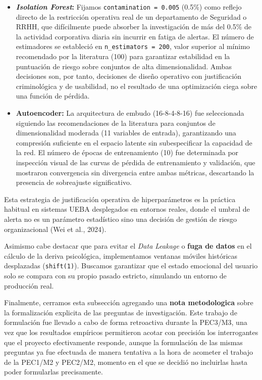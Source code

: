 \documentclass[IB]{TFUOC}%
\begin{document}
\begin{itemize}
    \item \textbf{\textit{Isolation Forest}:} Fijamos \texttt{contamination = 0.005} (0.5\%) como reflejo directo de la restricción operativa real de un departamento de Seguridad o RRHH, que difícilmente puede absorber la investigación de más del 0.5\% de la actividad corporativa diaria sin incurrir en fatiga de alertas. El número de estimadores se estableció en \texttt{n\_estimators = 200}, valor superior al mínimo recomendado por la literatura (100) para garantizar estabilidad en la puntuación de riesgo sobre conjuntos de alta dimensionalidad. Ambas decisiones son, por tanto, decisiones de diseño operativo con justificación criminológica y de usabilidad, no el resultado de una optimización ciega sobre una función de pérdida.
    
    \item \textbf{Autoencoder:} La arquitectura de embudo (16-8-4-8-16) fue seleccionada siguiendo las recomendaciones de la literatura para conjuntos de dimensionalidad moderada (11 variables de entrada), garantizando una compresión suficiente en el espacio latente sin subespecificar la capacidad de la red. El número de épocas de entrenamiento (10) fue determinada por inspección visual de las curvas de pérdida de entrenamiento y validación, que mostraron convergencia sin divergencia entre ambas métricas, descartando la presencia de sobreajuste significativo.
\end{itemize}

\noindent Esta estrategia de justificación operativa de hiperparámetros es la práctica habitual en sistemas UEBA desplegados en entornos reales, donde el umbral de alerta no es un parámetro estadístico sino una decisión de gestión de riesgo organizacional (Wei et al., 2024).

\medskip
\noindent Asimismo cabe destacar que para evitar el \textit{Data Leakage} o \textbf{fuga de datos} en el cálculo de la deriva psicológica, implementamos ventanas móviles históricas desplazadas (\texttt{shift(1)}). Buscamos garantizar que el estado emocional del usuario solo se compara con su propio pasado estricto, simulando un entorno de producción real.

\medskip
\noindent Finalmente, cerramos esta subsección agregando una \textbf{nota metodologica} sobre la formalización explicita de las preguntas de investigación. Este trabajo de formulación fue llevado a cabo de forma retroactiva durante la PEC3/M3, una vez que los resultados empíricos permitieron acotar con precisión los interrogantes que el proyecto efectivamente responde, aunque la formulación de las mismas preguntas ya fue efectuada de manera tentativa a la hora de acometer el trabajo de la PEC1/M2 y PEC2/M2, momento en el que se decidió no incluirlas hasta poder formularlas precisamente.
\end{document}
